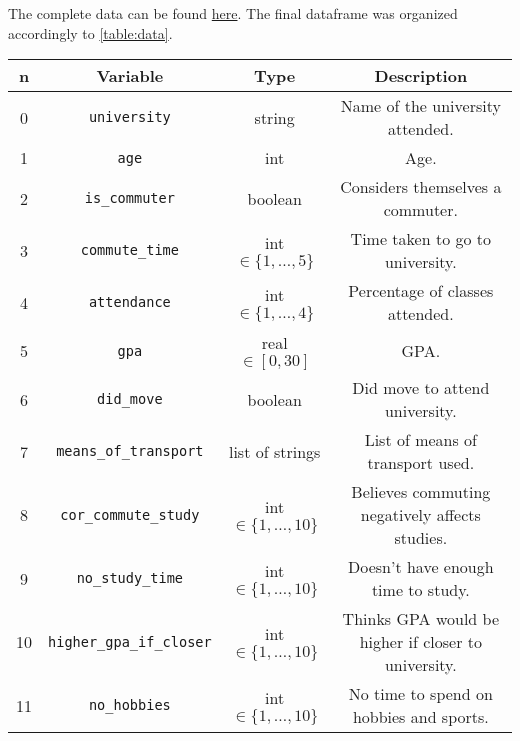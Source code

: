 \documentclass[11pt]{extarticle}
\numberwithin{table}{section}
\numberwithin{figure}{section}
\numberwithin{equation}{section}
\begin{document}
The complete data can be found
\href{https://github.com/billy4479/stats-research-project/blob/master/data/merged.csv}{here}.
The final dataframe was organized accordingly to \cref{table:data}.

\begin{table}[!ht]
	\centering
	\begin{tabular}{|c|c|c|c|}
		\hline
		\textbf{n} & \textbf{Variable}                & \textbf{Type}              & \textbf{Description}                                \\
		\hline
		0          & \texttt{university}              & string                     & Name of the university attended.                    \\
		1          & \texttt{age}                     & int                        & Age.                                                \\
		2          & \texttt{is\_commuter}            & boolean                    & Considers themselves a commuter.                    \\
		3          & \texttt{commute\_time}           & int $\in \{1, \dots, 5\}$  & Time taken to go to university.                     \\
		4          & \texttt{attendance}              & int $\in \{1, \dots, 4\}$  & Percentage of classes attended.                     \\
		5          & \texttt{gpa}                     & real $\in [0,30]$          & GPA.                                                \\
		6          & \texttt{did\_move}               & boolean                    & Did move to attend university.                      \\
		7          & \texttt{means\_of\_transport}    & list of strings            & List of means of transport used.                    \\
		8          & \texttt{cor\_commute\_study}     & int $\in \{1, \dots, 10\}$ & Believes commuting negatively affects studies.      \\
		9          & \texttt{no\_study\_time}         & int $\in \{1, \dots, 10\}$ & Doesn't have enough time to study.                  \\
		10         & \texttt{higher\_gpa\_if\_closer} & int $\in \{1, \dots, 10\}$ & Thinks GPA would be higher if closer to university. \\
		11         & \texttt{no\_hobbies}             & int $\in \{1, \dots, 10\}$ & No time to spend on hobbies and sports.             \\

\end{tabular}
\end{table}
\end{document}
